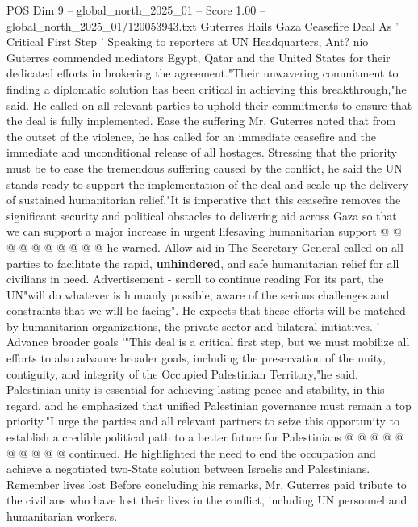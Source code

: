 \begin{textsample}{POS Dim 9 – global\_north\_2025\_01 – Score 1.00 – global\_north\_2025\_01/120053943.txt}  \label{ex:f9_pos_354}
Guterres Hails Gaza Ceasefire Deal As ' Critical First Step ' Speaking to reporters at UN Headquarters, Ant? nio Guterres commended mediators Egypt, Qatar and the United States for their dedicated efforts in brokering the agreement."Their unwavering commitment to finding a diplomatic solution has been critical in achieving this breakthrough,"he said.
He called on all relevant parties to uphold their commitments to ensure that the deal is fully implemented.
Ease the suffering Mr.
Guterres noted that from the outset of the violence, he has called for an immediate ceasefire and the immediate and unconditional release of all hostages.
Stressing that the priority must be to ease the tremendous suffering caused by the conflict, he said the UN stands ready to support the implementation of the deal and scale up the delivery of sustained humanitarian relief."It is imperative that this ceasefire removes the significant security and political obstacles to delivering aid across Gaza so that we can support a major increase in urgent lifesaving humanitarian support @ @ @ @ @ @ @ @ @ @ he warned.
Allow aid in The Secretary-General called on all parties to facilitate the rapid, \textbf{unhindered}, and safe humanitarian relief for all civilians in need.
Advertisement - scroll to continue reading For its part, the UN"will do whatever is humanly possible, aware of the serious challenges and constraints that we will be facing".
He expects that these efforts will be matched by humanitarian organizations, the private sector and bilateral initiatives. ' Advance broader goals '"This deal is a critical first step, but we must mobilize all efforts to also advance broader goals, including the preservation of the unity, contiguity, and integrity of the Occupied Palestinian Territory,"he said.
Palestinian unity is essential for achieving lasting peace and stability, in this regard, and he emphasized that unified Palestinian governance must remain a top priority."I urge the parties and all relevant partners to seize this opportunity to establish a credible political path to a better future for Palestinians @ @ @ @ @ @ @ @ @ @ continued.
He highlighted the need to end the occupation and achieve a negotiated two-State solution between Israelis and Palestinians.
Remember lives lost Before concluding his remarks, Mr.
Guterres paid tribute to the civilians who have lost their lives in the conflict, including UN personnel and humanitarian workers.

\end{textsample}
